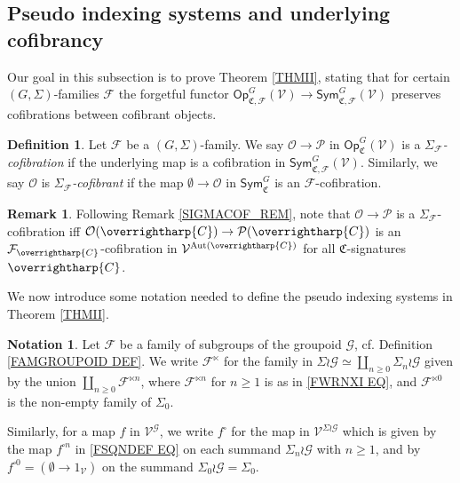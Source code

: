 \documentclass[a4paper,10pt
,draft
]{article}%
\numberwithin{equation}{section}
\numberwithin{figure}{section}
\theoremstyle{definition} %
\newtheorem{definition}[equation]{Definition}%
\newtheorem{remark}[equation]{Remark}%
\newtheorem{notation}[equation]{Notation}%
\newcommand{\vect}[1]{\text{\overrightharp{\ensuremath{#1}}}}
\newcommand{\Sym}{\ensuremath{\mathsf{Sym}}}%
\newcommand{\Op}{\mathsf{Op}}%
\DeclareMathOperator{\Aut}{Aut}%
\newcommand{\F}{\ensuremath{\mathcal F}}
\newcommand{\V}{\ensuremath{\mathcal V}}
\renewcommand{\O}{\ensuremath{\mathcal O}}
\renewcommand{\P}{\ensuremath{\mathcal P}}
\newcommand{\G}{\ensuremath{\mathcal G}}
\newcommand{\1}{\ensuremath{\mathbbm 1}}%
\begin{document}
\subsection{Pseudo indexing systems and underlying cofibrancy}
\label{INDSYS SEC}



Our goal in this subsection is to prove Theorem \ref{THMII},
stating that 
for certain $(G,\Sigma)$-families $\F$
the forgetful functor
$\Op^G_{\mathfrak C, \F}(\V) \to \Sym^G_{\mathfrak C, \F}(\V)$ preserves cofibrations between cofibrant objects.


\begin{definition}
Let $\F$ be a $(G,\Sigma)$-family.
We say $\O \to \P$ in $\Op^G_{\mathfrak C}(\V)$
is a \textit{$\Sigma_\F$-cofibration}
if the underlying map is a cofibration in $\Sym^G_{\mathfrak C, \F}(\V)$.
	Similarly, we say    
	$\O$ is \textit{$\Sigma_\F$-cofibrant} if 
	the map $\emptyset \to \O$
	in $\mathsf{Sym}^G_{\mathfrak{C}}$ is an $\F$-cofibration.
\end{definition}


\begin{remark}
	Following Remark \ref{SIGMACOF_REM}, 
	note that 
	$\O \to \P$ is a $\Sigma_\F$-cofibration iff 
	$\O(\vect C) \to \P(\vect C)$ is an $\mathcal F_{\vect C}$-cofibration in $\V^{\Aut(\vect C)}$
	for all $\mathfrak C$-signatures $\vect C$.
\end{remark} 



We now introduce some notation needed
to define the pseudo indexing systems in Theorem \ref{THMII}.



\begin{notation}\label{FSQUARE_NOT}
	Let $\F$ be a family of subgroups of the groupoid $\G$,
	cf. Definition \ref{FAMGROUPOID DEF}.
	We write $\F^{\ltimes}$
	for the family in 
	$\Sigma \wr \G \simeq \coprod_{n \geq 0} \Sigma_{n} \wr \G$
	given by the union
	$\coprod_{n \geq 0} \F^{\ltimes n}$,
	where $\F^{\ltimes n}$ for $n\geq 1$
	is as in \eqref{FWRNXI EQ},
	and $\F^{\ltimes 0}$ is the non-empty family of $\Sigma_0$.

	Similarly, for a map $f$ in $\V^{\mathcal G}$, 
	we write $f^{\square}$ for the map in $\V^{\Sigma \wr \mathcal G}$
	which is given by the map $f^{\square n}$
	in \eqref{FSQNDEF EQ}
	on each summand $\Sigma_n \wr \mathcal{G}$ with $n \geq 1$,
	and by $f^{\square 0} = (\emptyset \to 1_{\V})$
	on the summand 
	$\Sigma_0 \wr \mathcal{G} = \Sigma_0$.
\end{notation}
\end{document}
